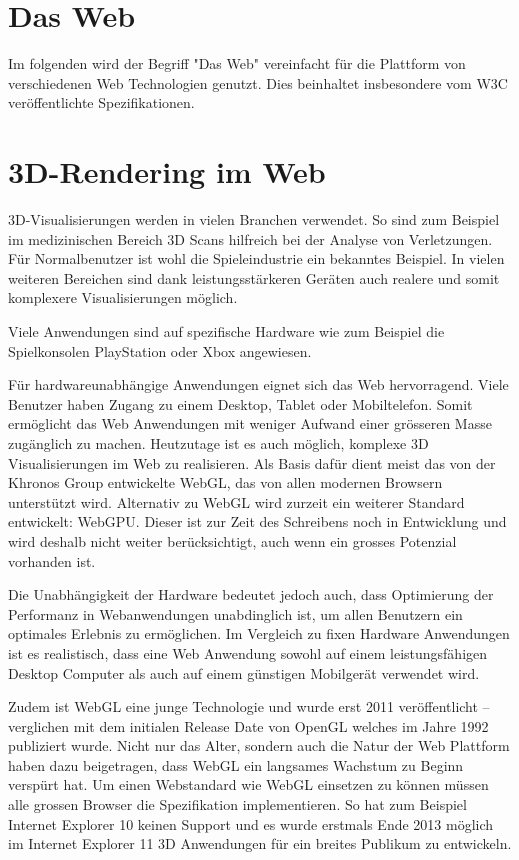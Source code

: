 \section{Das Web}
Im folgenden wird der Begriff "Das Web" vereinfacht für die Plattform von verschiedenen Web Technologien genutzt. Dies beinhaltet insbesondere vom W3C veröffentlichte Spezifikationen.

\section{3D-Rendering im Web}
3D-Visualisierungen werden in vielen Branchen verwendet.
So sind zum Beispiel im medizinischen Bereich 3D Scans hilfreich bei der Analyse von Verletzungen.
Für Normalbenutzer ist wohl die Spieleindustrie ein bekanntes Beispiel.
In vielen weiteren Bereichen sind dank leistungsstärkeren Geräten auch realere und somit komplexere Visualisierungen möglich. 

Viele Anwendungen sind auf spezifische Hardware wie zum Beispiel die Spielkonsolen PlayStation oder Xbox angewiesen.

Für hardwareunabhängige Anwendungen eignet sich das Web hervorragend. Viele Benutzer haben Zugang zu einem Desktop, Tablet oder Mobiltelefon.
Somit ermöglicht das Web Anwendungen mit weniger Aufwand einer grösseren Masse zugänglich zu machen.
Heutzutage ist es auch möglich, komplexe 3D Visualisierungen im Web zu realisieren.
Als Basis dafür dient meist das von der Khronos Group entwickelte WebGL, das von allen modernen Browsern unterstützt wird.
Alternativ zu WebGL wird zurzeit ein weiterer Standard entwickelt: WebGPU.
Dieser ist zur Zeit des Schreibens noch in Entwicklung und wird deshalb nicht weiter berücksichtigt, auch wenn ein grosses Potenzial vorhanden ist.

Die Unabhängigkeit der Hardware bedeutet jedoch auch, dass Optimierung der Performanz in Webanwendungen unabdinglich ist, um allen Benutzern ein optimales Erlebnis zu ermöglichen.
Im Vergleich zu fixen Hardware Anwendungen ist es realistisch, dass eine Web Anwendung sowohl auf einem leistungsfähigen Desktop Computer als auch auf einem günstigen Mobilgerät verwendet wird.

Zudem ist WebGL eine junge Technologie und wurde erst 2011 veröffentlicht – verglichen mit dem initialen Release Date von OpenGL welches im Jahre 1992 publiziert wurde.
Nicht nur das Alter, sondern auch die Natur der Web Plattform haben dazu beigetragen, dass WebGL ein langsames Wachstum zu Beginn verspürt hat. Um einen Webstandard wie WebGL einsetzen zu können müssen alle grossen Browser die Spezifikation implementieren. So hat zum Beispiel Internet Explorer 10 keinen Support und es wurde erstmals Ende 2013 möglich im Internet Explorer 11 3D Anwendungen für ein breites Publikum zu entwickeln.

